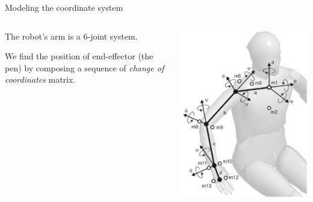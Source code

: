 \documentclass{beamer}
\begin{document}
\begin{frame}[allowframebreaks]{Modeling the coordinate system}

	\begin{columns}
		\begin{column}{0.5\textwidth}
			\justify
			The robot's arm is a 6-joint system.

			We find the position of end-effector (the pen) by composing a sequence of \emph{change of coordinates} matrix.
		\end{column}
		\begin{column}{0.5\textwidth}  %
			\begin{center}
				\includegraphics[scale = 0.35]{arm.jpg}\cite{3}
			\end{center}
		\end{column}
	\end{columns}





\end{frame}
\end{document}
